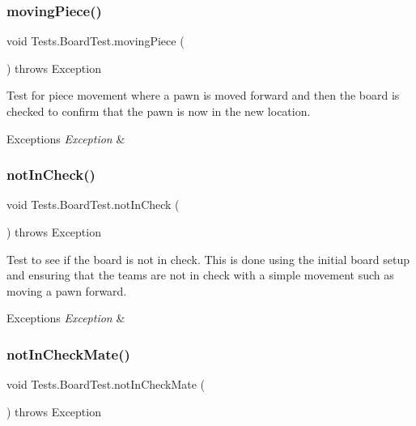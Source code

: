 \subsubsection{\texorpdfstring{moving\+Piece()}{movingPiece()}}
{\footnotesize\ttfamily void Tests.\+Board\+Test.\+moving\+Piece (\begin{DoxyParamCaption}{ }\end{DoxyParamCaption}) throws Exception}

Test for piece movement where a pawn is moved forward and then the board is checked to confirm that the pawn is now in the new location. 
\begin{DoxyExceptions}{Exceptions}
{\em Exception} & \\
\hline
\end{DoxyExceptions}
\hypertarget{class_tests_1_1_board_test_a929e0f87bd865f7fdf810ab37768f4e8}{}\label{class_tests_1_1_board_test_a929e0f87bd865f7fdf810ab37768f4e8} 
\subsubsection{\texorpdfstring{not\+In\+Check()}{notInCheck()}}
{\footnotesize\ttfamily void Tests.\+Board\+Test.\+not\+In\+Check (\begin{DoxyParamCaption}{ }\end{DoxyParamCaption}) throws Exception}

Test to see if the board is not in check. This is done using the initial board setup and ensuring that the team\textquotesingle{}s are not in check with a simple movement such as moving a pawn forward. 
\begin{DoxyExceptions}{Exceptions}
{\em Exception} & \\
\hline
\end{DoxyExceptions}
\hypertarget{class_tests_1_1_board_test_a2e13dc59ccbbdb6535ed634b612b2fb1}{}\label{class_tests_1_1_board_test_a2e13dc59ccbbdb6535ed634b612b2fb1} 
\subsubsection{\texorpdfstring{not\+In\+Check\+Mate()}{notInCheckMate()}}
{\footnotesize\ttfamily void Tests.\+Board\+Test.\+not\+In\+Check\+Mate (\begin{DoxyParamCaption}{ }\end{DoxyParamCaption}) throws Exception}

